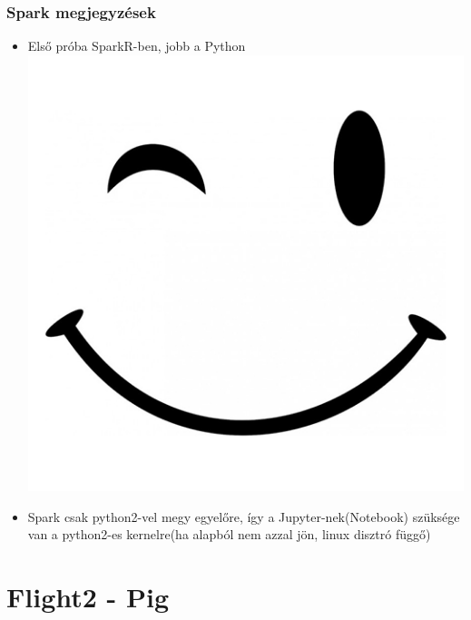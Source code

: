 \documentclass{beamer}
\begin{document}

\begin{frame}
\frametitle{Spark megjegyzések}
\begin{itemize}
\item Első próba SparkR-ben,  jobb a Python \includegraphics[scale=0.025]{figures/wink}
\item Spark csak python2-vel megy egyelőre, így a Jupyter-nek(Notebook) szüksége van a python2-es kernelre(ha alapból nem azzal jön, linux disztró függő)
\end{itemize}
\end{frame}

\section{Flight2 - Pig} %
\end{document}
